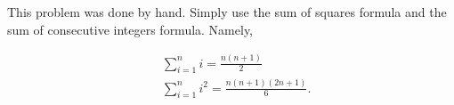 \documentclass[12pt]{article}
\begin{document}
\noindent
This problem was done by hand. Simply use the sum of squares formula and the sum of consecutive integers formula. Namely,

\begin{align*}
    &\sum_{i = 1}^n i = \frac{n(n+1)}{2}\\
    &\sum_{i = 1}^n i^2 = \frac{n(n+1)(2n+1)}{6}.
\end{align*}
\end{document}
